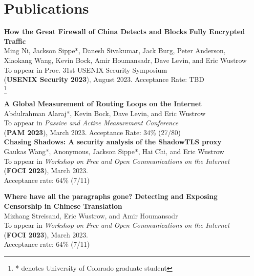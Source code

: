 \documentclass[margin,11pt]{res} %
\newcommand\blfootnote[1]{%
    \begingroup
    \renewcommand\thefootnote{}\footnote{#1}%
    \addtocounter{footnote}{-1}%
    \endgroup
}
\begin{document}

\vspace{6pt}
\section{\large Publications}

    \textbf{How the Great Firewall of China Detects and Blocks Fully Encrypted Traffic} \\
    Ming Ni, Jackson Sippe*, Danesh Sivakumar, Jack Burg, Peter Anderson, Xiaokang Wang, Kevin Bock, Amir Houmansadr, Dave Levin, and Eric Wustrow \\
    To appear in {Proc. 31st USENIX Security Symposium} \\
    (\textbf{USENIX Security 2023}), August 2023. Acceptance Rate: TBD \\
    \blfootnote{* denotes University of Colorado graduate student}


    \textbf{A Global Measurement of Routing Loops on the Internet} \\
    Abdulrahman Alaraj*, Kevin Bock, Dave Levin, and Eric Wustrow \\
    To appear in \emph{Passive and Active Measurement Conference} \\
    (\textbf{PAM 2023}), March 2023.
    Acceptance Rate: 34\% (27/80) \\

    \textbf{Chasing Shadows: A security analysis of the ShadowTLS proxy} \\
    Gaukas Wang*, Anonymous, Jackson Sippe*, Hai Chi, and Eric Wustrow \\
    To appear in \emph{Workshop on Free and Open Communications on the Internet} \\
    (\textbf{FOCI 2023}), March 2023. \\
    Acceptance rate: 64\% (7/11)

    \textbf{Where have all the paragraphs gone? Detecting and Exposing Censorship in Chinese Translation} \\
    Mizhang Streisand, Eric Wustrow, and Amir Houmansadr \\
    To appear in \emph{Workshop on Free and Open Communications on the Internet} \\
    (\textbf{FOCI 2023}), March 2023. \\
    Acceptance rate: 64\% (7/11)
\end{document}
